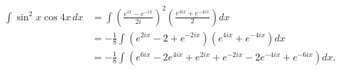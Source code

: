 \begin{align} \int \sin^2 x \cos 4x \, dx &= \int \left(\frac{e^{ix}-e^{-ix}}{2i}\right)^2\left(\frac{e^{4ix}+e^{-4ix}}{2}\right) dx \\[6pt] &= -\frac18\int \left(e^{2ix} - 2 + e^{-2ix}\right)\left(e^{4ix}+e^{-4ix}\right) dx \\[6pt] &= -\frac18\int \left(e^{6ix} - 2e^{4ix} + e^{2ix} + e^{-2ix} - 2e^{-4ix} + e^{-6ix}\right) dx. \end{align}

